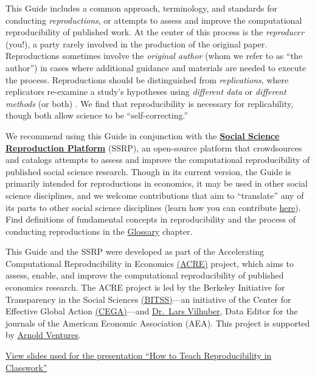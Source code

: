 \documentclass[
]{book}
\begin{document}
This Guide includes a common approach, terminology, and standards for conducting \emph{reproductions}, or attempts to assess and improve the computational reproducibility of published work. At the center of this process is the \emph{reproducer} (you!), a party rarely involved in the production of the original paper. Reproductions sometimes involve the \emph{original author} (whom we refer to as ``the author'') in cases where additional guidance and materials are needed to execute the process. Reproductions should be distinguished from \emph{replications}, where replicators re-examine a study's hypotheses using \emph{different data} or \emph{different methods} (or both) \citep{King95}. We find that reproducibility is necessary for replicability, though both allow science to be ``self-correcting.''

We recommend using this Guide in conjunction with the \href{https://www.socialsciencereproduction.org/}{\textbf{Social Science Reproduction Platform}} (SSRP), an open-source platform that crowdsources and catalogs attempts to assess and improve the computational reproducibility of published social science research. Though in its current version, the Guide is primarily intended for reproductions in economics, it may be used in other social science disciplines, and we welcome contributions that aim to ``translate'' any of its parts to other social science disciplines (learn how you can contribute \href{https://bitss.github.io/ACRE/contributions.html}{here}). Find definitions of fundamental concepts in reproducibility and the process of conducting reproductions in the \href{https://bitss.github.io/ACRE/definitions.html}{Glossary} chapter.

This Guide and the SSRP were developed as part of the Accelerating Computational Reproducibility in Economics \href{https://www.bitss.org/ecosystem/acre/}{(ACRE)} project, which aims to assess, enable, and improve the computational reproducibility of published economics research. The ACRE project is led by the Berkeley Initiative for Transparency in the Social Sciences \href{https://bitss.org}{(BITSS)}---an initiative of the Center for Effective Global Action \href{https://cega.berkeley.edu/}{(CEGA)}---and \href{https://www.vilhuber.com/lars/}{Dr.~Lars Vilhuber}, Data Editor for the journals of the American Economic Association (AEA). This project is supported by \href{https://www.arnoldventures.org/}{Arnold Ventures}.

\href{https://bitss.github.io/WEAI2020_slides/}{View slides used for the presentation ``How to Teach Reproducibility in Classwork''}
\end{document}
